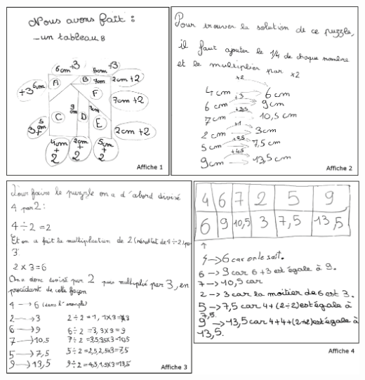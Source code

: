 \begin{exercice}[CRPE 2018 G2]
\begin{enumerate}
\end{enumerate}
\begin{center}
   \includegraphics[width=17cm]{Transversal/Images/Tra8_analyse_puzzle1} \\
   \includegraphics[width=17cm]{Transversal/Images/Tra8_analyse_puzzle2}
\end{center}
\end{exercice}

